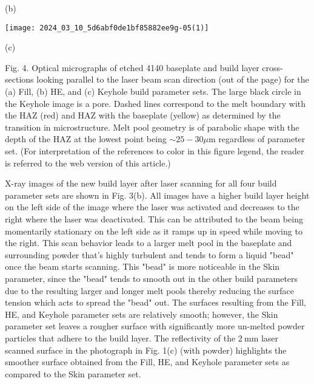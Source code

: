 \documentclass[10pt]{article}
\begin{document}
(b)

\begin{center}
\texttt{[image: 2024\_03\_10\_5d6abf0de1bf85882ee9g-05(1)]}
\end{center}

(c)

Fig. 4. Optical micrographs of etched 4140 baseplate and build layer cross-sections looking parallel to the laser beam scan direction (out of the page) for the (a) Fill, (b) HE, and (c) Keyhole build parameter sets. The large black circle in the Keyhole image is a pore. Dashed lines correspond to the melt boundary with the HAZ (red) and HAZ with the baseplate (yellow) as determined by the transition in microstructure. Melt pool geometry is of parabolic shape with the depth of the HAZ at the lowest point being $\sim 25-30 \mu \mathrm{m}$ regardless of parameter set. (For interpretation of the references to color in this figure legend, the reader is referred to the web version of this article.)

X-ray images of the new build layer after laser scanning for all four build parameter sets are shown in Fig. 3(b). All images have a higher build layer height on the left side of the image where the laser was activated and decreases to the right where the laser was deactivated. This can be attributed to the beam being momentarily stationary on the left side as it ramps up in speed while moving to the right. This scan behavior leads to a larger melt pool in the baseplate and surrounding powder that's highly turbulent and tends to form a liquid "bead" once the beam starts scanning. This "bead" is more noticeable in the Skin parameter, since the "bead" tends to smooth out in the other build parameters due to the resulting larger and longer melt pools thereby reducing the surface tension which acts to spread the "bead" out. The surfaces resulting from the Fill, HE, and Keyhole parameter sets are relatively smooth; however, the Skin parameter set leaves a rougher surface with significantly more un-melted powder particles that adhere to the build layer. The reflectivity of the $2 \mathrm{~mm}$ laser scanned surface in the photograph in Fig. 1(c) (with powder) highlights the smoother surface obtained from the Fill, HE, and Keyhole parameter sets as compared to the Skin parameter set.
\end{document}

